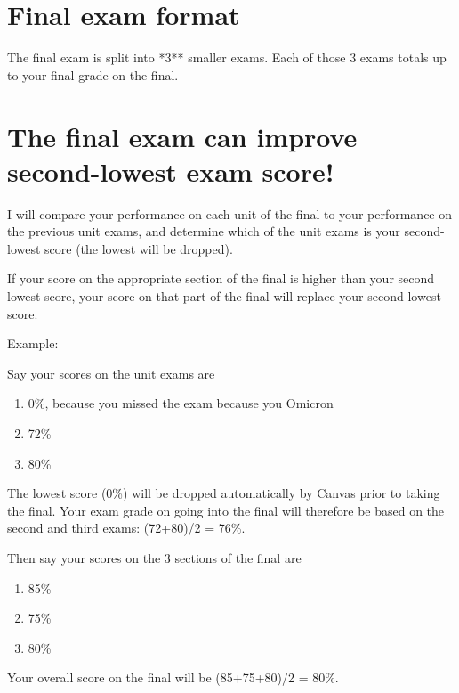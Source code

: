 \documentclass[
]{book}
\providecommand{\tightlist}{%
  \setlength{\itemsep}{0pt}\setlength{\parskip}{0pt}}
\begin{document}
\hypertarget{final-exam-format}{%
\section{Final exam format}\label{final-exam-format}}

The final exam is split into *3** smaller exams. Each of those 3 exams totals up to your final grade on the final.

\hypertarget{the-final-exam-can-improve-second-lowest-exam-score}{%
\section{The final exam can improve second-lowest exam score!}\label{the-final-exam-can-improve-second-lowest-exam-score}}

I will compare your performance on each unit of the final to your performance on the previous unit exams, and determine which of the unit exams is your second-lowest score (the lowest will be dropped).

If your score on the appropriate section of the final is higher than your second lowest score, your score on that part of the final will replace your second lowest score.

Example:

Say your scores on the unit exams are

\begin{enumerate}
\def\labelenumi{\arabic{enumi}.}
\tightlist
\item
  0\%, because you missed the exam because you Omicron
\item
  72\%
\item
  80\%
\end{enumerate}

The lowest score (0\%) will be dropped automatically by Canvas prior to taking the final. Your exam grade on going into the final will therefore be based on the second and third exams: (72+80)/2 = 76\%.

Then say your scores on the 3 sections of the final are

\begin{enumerate}
\def\labelenumi{\arabic{enumi}.}
\tightlist
\item
  85\%
\item
  75\%
\item
  80\%
\end{enumerate}

Your overall score on the final will be (85+75+80)/2 = 80\%.
\end{document}

